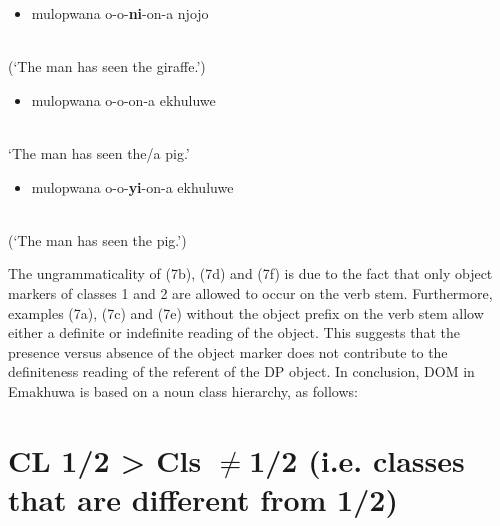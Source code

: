 \documentclass[output=paper]{langsci/langscibook}
\begin{document}
\begin{itemize}
\item \gll *mulopwana        o-o-\textbf{ni}{}-on-a                         njojo\\
\end{itemize}
     \\
\glt (‘The man has seen the giraffe.’)
\z

\begin{itemize}
\item \gll mulopwana           o-o-on-a                           ekhuluwe\\
\end{itemize}
     \\
\glt ‘The man has seen the/a pig.’
\z

\begin{itemize}
\item \gll *mulopwana         o-o-\textbf{yi}{}-on-a                           ekhuluwe\\
\end{itemize}
     \\
\glt (‘The man has seen the pig.’)
\z

The ungrammaticality of (7b), (7d) and (7f) is due to the fact that only object markers of classes 1 and 2 are allowed to occur on the verb stem. Furthermore, examples (7a), (7c) and (7e) without the object prefix on the verb stem allow either a definite or indefinite reading of the object. This suggests that the presence versus absence of the object marker does not contribute to the definiteness reading of the referent of the DP object. In conclusion, DOM in Emakhuwa is based on a noun class hierarchy, as follows:

\chapter[  CL 1/2 {\textgreater} Cls ${\neq}$1/2 (i.e. classes that are different from 1/2)]{\textstyleFontepargpadroi{  }CL 1/2 {\textgreater} Cls ${\neq}$1/2 (i.e. classes that are different from 1/2)}
\end{document}
